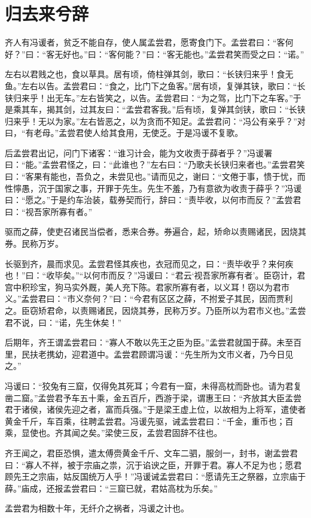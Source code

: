 \documentclass[12pt,UTF-8,openany]{ctexbook}
\begin{document}
\chapter{归去来兮辞}

\begin{normalsize}
    
    齐人有冯谖者，贫乏不能自存，使人属孟尝君，愿寄食门下。孟尝君曰：“客何好？”曰：“客无好也。”曰：“客何能？”曰：“客无能也。”孟尝君笑而受之曰：“诺。”
    
    左右以君贱之也，食以草具。居有顷，倚柱弹其剑，歌曰：“长铗归来乎！食无鱼。”左右以告。孟尝君曰：“食之，比门下之鱼客。”居有顷，复弹其铗，歌曰：“长铗归来乎！出无车。”左右皆笑之，以告。孟尝君曰：“为之驾，比门下之车客。”于是乘其车，揭其剑，过其友曰：“孟尝君客我。”后有顷，复弹其剑铗，歌曰：“长铗归来乎！无以为家。”左右皆恶之，以为贪而不知足。孟尝君问：“冯公有亲乎？”对曰，“有老母。”孟尝君使人给其食用，无使乏。于是冯谖不复歌。
    
    后孟尝君出记，问门下诸客：“谁习计会，能为文收责于薛者乎？”冯谖署曰：“能。”孟尝君怪之，曰：“此谁也？”左右曰：“乃歌夫长铗归来者也。”孟尝君笑曰：“客果有能也，吾负之，未尝见也。”请而见之，谢曰：“文倦于事，愦于忧，而性懧愚，沉于国家之事，开罪于先生。先生不羞，乃有意欲为收责于薛乎？”冯谖曰：“愿之。”于是约车治装，载券契而行，辞曰：“责毕收，以何市而反？”孟尝君曰：“视吾家所寡有者。”
    
    驱而之薛，使吏召诸民当偿者，悉来合券。券遍合，起，矫命以责赐诸民，因烧其券。民称万岁。
    
    长驱到齐，晨而求见。孟尝君怪其疾也，衣冠而见之，曰：“责毕收乎？来何疾也！”曰：“收毕矣。”“以何市而反？”冯谖曰：“君云‘视吾家所寡有者’。臣窃计，君宫中积珍宝，狗马实外厩，美人充下陈。君家所寡有者，以义耳！窃以为君市义。”孟尝君曰：“市义奈何？”曰：“今君有区区之薛，不拊爱子其民，因而贾利之。臣窃矫君命，以责赐诸民，因烧其券，民称万岁。乃臣所以为君市义也。”孟尝君不说，曰：“诺，先生休矣！”
    
    后期年，齐王谓孟尝君曰：“寡人不敢以先王之臣为臣。”孟尝君就国于薛。未至百里，民扶老携幼，迎君道中。孟尝君顾谓冯谖：“先生所为文市义者，乃今日见之。”
    
    冯谖曰：“狡兔有三窟，仅得免其死耳；今君有一窟，未得高枕而卧也。请为君复凿二窟。”孟尝君予车五十乘，金五百斤，西游于梁，谓惠王曰：“齐放其大臣孟尝君于诸侯，诸侯先迎之者，富而兵强。”于是梁王虚上位，以故相为上将军，遣使者黄金千斤，车百乘，往聘孟尝君。冯谖先驱，诫孟尝君曰：“千金，重币也；百乘，显使也。齐其闻之矣。”梁使三反，孟尝君固辞不往也。
    
    齐王闻之，君臣恐惧，遣太傅赍黄金千斤、文车二驷，服剑一，封书，谢孟尝君曰：“寡人不祥，被于宗庙之祟，沉于谄谀之臣，开罪于君。寡人不足为也；愿君顾先王之宗庙，姑反国统万人乎！”冯谖诫孟尝君曰：“愿请先王之祭器，立宗庙于薛。”庙成，还报孟尝君曰：“三窟已就，君姑高枕为乐矣。”
    
    孟尝君为相数十年，无纤介之祸者，冯谖之计也。
\end{normalsize}
\end{document}

